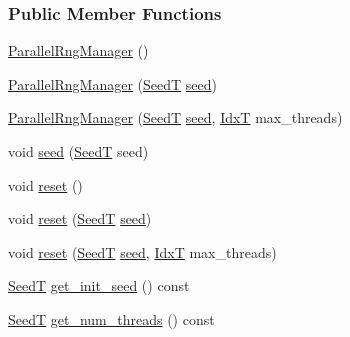 \subsubsection*{Public Member Functions}
\begin{DoxyCompactItemize}
\item 
\hyperlink{classparallel__rng_1_1ParallelRngManager_a496be695fb13bb12b157995751b27c36}{Parallel\+Rng\+Manager} ()
\item 
\hyperlink{classparallel__rng_1_1ParallelRngManager_aa355c6c8171aab195ab4d1b99482c1dd}{Parallel\+Rng\+Manager} (\hyperlink{namespaceparallel__rng_a462b8721a1aabe3b86582e864640c707}{SeedT} \hyperlink{classparallel__rng_1_1ParallelRngManager_a27fce29ff0415e0652d1cad60c3caea6}{seed})
\item 
\hyperlink{classparallel__rng_1_1ParallelRngManager_a04140678f44723851da5a9fd2d15e4a7}{Parallel\+Rng\+Manager} (\hyperlink{namespaceparallel__rng_a462b8721a1aabe3b86582e864640c707}{SeedT} \hyperlink{classparallel__rng_1_1ParallelRngManager_a27fce29ff0415e0652d1cad60c3caea6}{seed}, \hyperlink{namespaceparallel__rng_aa22fa3e339aee5927780aac099dfc6f3}{IdxT} max\+\_\+threads)
\item 
void \hyperlink{classparallel__rng_1_1ParallelRngManager_a27fce29ff0415e0652d1cad60c3caea6}{seed} (\hyperlink{namespaceparallel__rng_a462b8721a1aabe3b86582e864640c707}{SeedT} seed)
\item 
void \hyperlink{classparallel__rng_1_1ParallelRngManager_ae2d6bfb8558004b9a89c5de84d9beab6}{reset} ()
\item 
void \hyperlink{classparallel__rng_1_1ParallelRngManager_a62a8227d353a02dbaa52836520cde365}{reset} (\hyperlink{namespaceparallel__rng_a462b8721a1aabe3b86582e864640c707}{SeedT} \hyperlink{classparallel__rng_1_1ParallelRngManager_a27fce29ff0415e0652d1cad60c3caea6}{seed})
\item 
void \hyperlink{classparallel__rng_1_1ParallelRngManager_a239005e74c441129856969702e2461f4}{reset} (\hyperlink{namespaceparallel__rng_a462b8721a1aabe3b86582e864640c707}{SeedT} \hyperlink{classparallel__rng_1_1ParallelRngManager_a27fce29ff0415e0652d1cad60c3caea6}{seed}, \hyperlink{namespaceparallel__rng_aa22fa3e339aee5927780aac099dfc6f3}{IdxT} max\+\_\+threads)
\item 
\hyperlink{namespaceparallel__rng_a462b8721a1aabe3b86582e864640c707}{SeedT} \hyperlink{classparallel__rng_1_1ParallelRngManager_a415ec367ffcf7828b47d941dd881bfb7}{get\+\_\+init\+\_\+seed} () const 
\item 
\hyperlink{namespaceparallel__rng_a462b8721a1aabe3b86582e864640c707}{SeedT} \hyperlink{classparallel__rng_1_1ParallelRngManager_ab11a27b2a5f33ecda2969a3eb42b9e3c}{get\+\_\+num\+\_\+threads} () const 

\end{DoxyCompactItemize}
